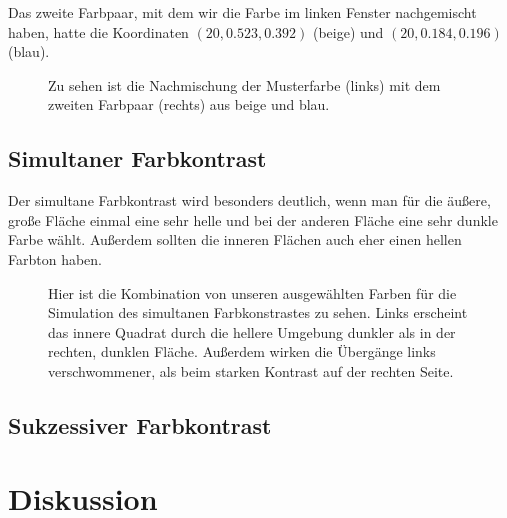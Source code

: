\documentclass[11pt]{article}
\begin{document}
Das zweite Farbpaar, mit dem wir die Farbe im linken Fenster nachgemischt haben, hatte die Koordinaten $(20,0.523, 0.392)$ (beige) und $(20,0.184, 0.196)$ (blau). 

\begin{figure}[H]
\caption{Zu sehen ist die Nachmischung der Musterfarbe (links) mit dem zweiten Farbpaar (rechts) aus beige und blau.}
\label{meta2}
\end{figure}

\subsection{Simultaner Farbkontrast}
Der simultane Farbkontrast wird besonders deutlich, wenn man für die äußere, große Fläche einmal eine sehr helle und bei der anderen Fläche eine sehr dunkle Farbe wählt. Außerdem sollten die inneren Flächen auch eher einen hellen Farbton haben. 

\begin{figure}[H]
\caption{Hier ist die Kombination von unseren ausgewählten Farben für die Simulation des simultanen Farbkonstrastes zu sehen. Links erscheint das innere Quadrat durch die hellere Umgebung dunkler als in der rechten, dunklen Fläche. Außerdem wirken die Übergänge links verschwommener, als beim starken Kontrast auf der rechten Seite.}
\label{meta2}
\end{figure}

\subsection{Sukzessiver Farbkontrast}

\section{Diskussion}
\end{document}
